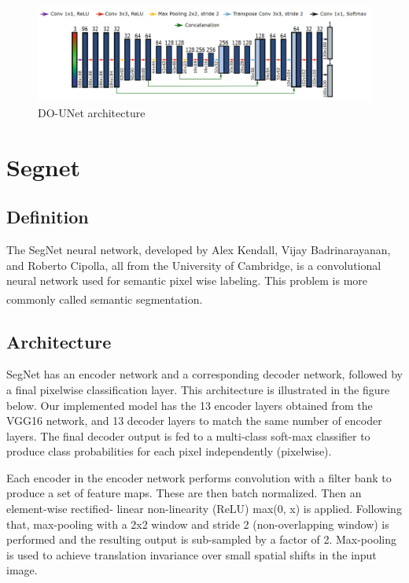 \begin{figure}[H]
\centering
  \vspace{0.2in}
    \centerline{\includegraphics[width = \linewidth]{../images/DO-UNET.png}}
    \caption{DO-UNet architecture}
    \label{fig:DO-UNET}
\end{figure}

\newpage

\section{Segnet}
\subsection{Definition}
\hspace{\parindent}
The SegNet neural network, developed by Alex Kendall, Vijay Badrinarayanan, and Roberto Cipolla, all from the University of Cambridge, is a convolutional neural network used for semantic pixel wise labeling. This problem is more commonly called semantic segmentation. \textsuperscript{\cite{badrinarayanan2017segnet}}

\subsection{Architecture}
\hspace{\parindent}
SegNet has an encoder network and a corresponding decoder network, followed by a final pixelwise classification layer. This architecture is illustrated in the figure below.
Our implemented model has the 13 encoder layers obtained from the VGG16 network, and 13 decoder layers to match the same number of encoder layers. The final decoder output is fed to a multi-class soft-max classifier to produce class probabilities for each pixel independently (pixelwise).

Each encoder in the encoder network performs convolution with a filter bank to produce a set of feature maps. These are then batch normalized. Then an element-wise rectified- linear non-linearity (ReLU) max(0, x) is applied. Following that, max-pooling with a 2x2 window and stride 2 (non-overlapping window) is performed and the resulting output is sub-sampled by a factor of 2. Max-pooling is used to achieve translation invariance over small spatial shifts in the input image.

